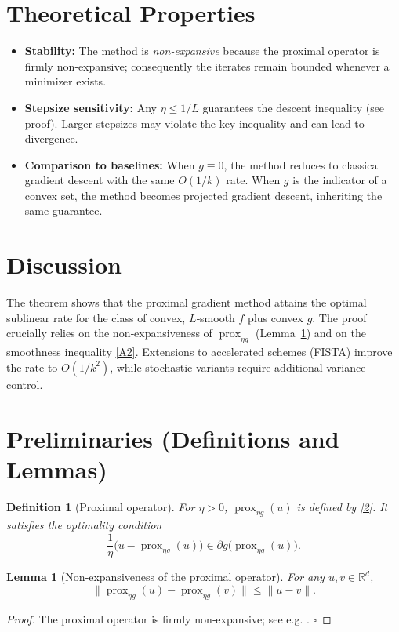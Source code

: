 \documentclass{article}
\newtheorem{lemma}{Lemma}
\newtheorem{definition}{Definition}
\newcommand{\prox}{\operatorname{prox}}
\newcommand{\R}{\mathbb{R}}
\begin{document}
\section*{Theoretical Properties}
\begin{itemize}
  \item \textbf{Stability:} The method is \emph{non‑expansive} because the proximal operator is firmly non‑expansive; consequently the iterates remain bounded whenever a minimizer exists.
  \item \textbf{Stepsize sensitivity:} Any $\eta\le1/L$ guarantees the descent inequality (see proof). Larger stepsizes may violate the key inequality and can lead to divergence.
  \item \textbf{Comparison to baselines:} When $g\equiv0$, the method reduces to classical gradient descent with the same $O(1/k)$ rate. When $g$ is the indicator of a convex set, the method becomes projected gradient descent, inheriting the same guarantee.
\end{itemize}

\section*{Discussion}
The theorem shows that the proximal gradient method attains the optimal sublinear rate for the class of convex, $L$‑smooth $f$ plus convex $g$. The proof crucially relies on the non‑expansiveness of $\prox_{\eta g}$ (Lemma~\ref{lem:nonexp}) and on the smoothness inequality \eqref{A2}. Extensions to accelerated schemes (FISTA) improve the rate to $O(1/k^{2})$, while stochastic variants require additional variance control.

\newpage
\section*{Preliminaries (Definitions and Lemmas)}
\begin{definition}[Proximal operator]\label{def:prox}
For $\eta>0$, $\prox_{\eta g}(u)$ is defined by \eqref{2}.  
It satisfies the \emph{optimality condition}
\[
\frac{1}{\eta}\bigl(u-\prox_{\eta g}(u)\bigr)\in\partial g\!\bigl(\prox_{\eta g}(u)\bigr).
\tag{5}
\]
\end{definition}

\begin{lemma}[Non‑expansiveness of the proximal operator]\label{lem:nonexp}
For any $u,v\in\R^{d}$,
\[
\bigl\|\prox_{\eta g}(u)-\prox_{\eta g}(v)\bigr\|\le\|u-v\|.
\tag{6}
\]
\end{lemma}
\begin{proof}
The proximal operator is firmly non‑expansive; see e.g. \cite[Prop.~12.27]{Bauschke2011}. $\square$
\end{proof}
\end{document}
